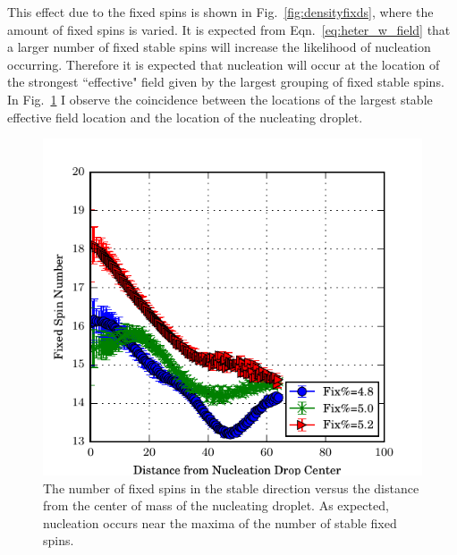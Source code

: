 This  effect due to the fixed spins   is shown in Fig.~\ref{fig:densityfixds}, where the amount of fixed spins is varied. It is expected from Eqn.~\eqref{eq:heter_w_field} that a larger number of fixed stable spins will increase the likelihood of nucleation occurring. Therefore it is expected that nucleation will occur at the location of the strongest ``effective" field given by the largest grouping of fixed stable spins. In Fig.~\ref{fig:densityfixdens} I observe the coincidence between the locations of the largest stable effective field location and the location of the nucleating droplet. %
\begin{figure}[!h]
 \centering
 \includegraphics[scale=1.05]{Figures/density/density_fix_density_all.pdf}
 \caption{The number of fixed spins in the stable direction versus the distance from the center of mass of the nucleating droplet.  As expected, nucleation occurs near the maxima of the number of stable fixed spins. }
 \label{fig:densityfixdens}
\end{figure}%


